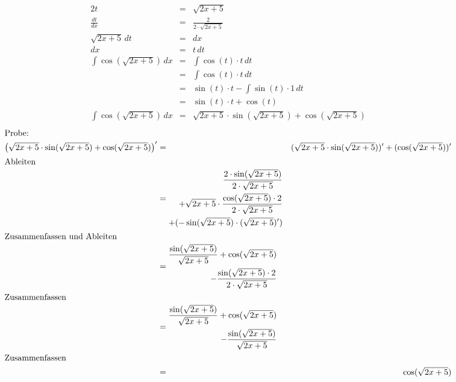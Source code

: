 \documentclass[10pt,a4paper,oneside,ngerman,numbers=noenddot]{scrartcl}
\begin{document}
\subsubsection{} %
\begin{alignat*}{2}
t &=& \sqrt{2x+5} \\
\frac{dt}{dx} &=& \frac{2}{2 \cdot \sqrt{2x+5}} \\
\sqrt{2x+5}\,dt &=& dx \\
dx &=& t\,dt\\
\int \cos(\sqrt{2x+5}) \,dx &=& \int \cos(t) \cdot t\,dt \\
&=& \int \cos(t) \cdot t\,dt \\
&=& \sin(t) \cdot t - \int \sin(t) \cdot 1 \,dt \\
&=& \sin(t) \cdot t + \cos(t) \\
\int \cos(\sqrt{2x+5}) \,dx &=& \sqrt{2x+5} \cdot \sin(\sqrt{2x+5}) + \cos(\sqrt{2x+5})
\end{alignat*}
\begin{alignat*}{3}
\intertext{Probe:}
\left(\sqrt{2x+5} \cdot \sin(\sqrt{2x+5}) + \cos(\sqrt{2x+5})\right)' &=& (\sqrt{2x+5} \cdot \sin(\sqrt{2x+5}))' + (\cos(\sqrt{2x+5}))' \\
\intertext{Ableiten}
&=\begin{split}\frac{2 \cdot \sin(\sqrt{2x+5})}{2 \cdot \sqrt{2x+5}}\\ + \sqrt{2x+5} \cdot \frac{\cos(\sqrt{2x+5}) \cdot 2}{2 \cdot \sqrt{2x+5}} \\ + (-\sin(\sqrt{2x+5}) \cdot (\sqrt{2x+5})')\end{split}\\
\intertext{Zusammenfassen und Ableiten}
&= \begin{split}\frac{\sin(\sqrt{2x+5})}{\sqrt{2x+5}} + \cos(\sqrt{2x+5})\\ - \frac{\sin(\sqrt{2x+5}) \cdot 2}{2 \cdot \sqrt{2x+5}}\end{split} \\
\intertext{Zusammenfassen}
&= \begin{split}\frac{\sin(\sqrt{2x+5})}{\sqrt{2x+5}} + \cos(\sqrt{2x+5})\\ - \frac{\sin(\sqrt{2x+5})}{\sqrt{2x+5}}\end{split} \\
\intertext{Zusammenfassen}
&=& \cos(\sqrt{2x+5})
\end{alignat*}
\end{document}
